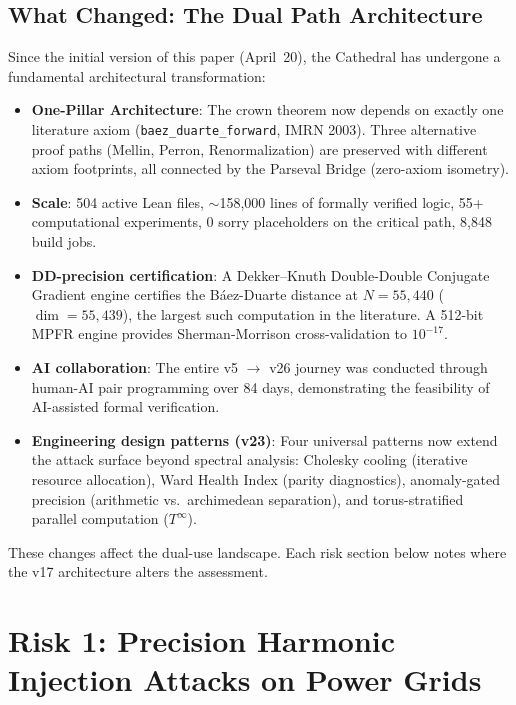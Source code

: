 \documentclass[11pt,a4paper]{article}
\begin{document}
\subsection{What Changed: The Dual Path Architecture}

Since the initial version of this paper (April~20), the Cathedral
has undergone a fundamental architectural transformation:

\begin{itemize}
  \item \textbf{One-Pillar Architecture}: The crown theorem now depends
    on exactly one literature axiom (\texttt{baez\_duarte\_forward},
    IMRN 2003). Three alternative proof paths (Mellin, Perron,
    Renormalization) are preserved with different axiom footprints,
    all connected by the Parseval Bridge (zero-axiom isometry).
  \item \textbf{Scale}: 504 active Lean files, $\sim$158{,}000 lines of
    formally verified logic, 55+ computational experiments,
    0 sorry placeholders on the critical path, 8{,}848 build jobs.
  \item \textbf{DD-precision certification}: A Dekker--Knuth
    Double-Double Conjugate Gradient engine certifies the
    B\'aez-Duarte distance at $N = 55{,}440$ ($\dim = 55{,}439$),
    the largest such computation in the literature. A 512-bit MPFR
    engine provides Sherman-Morrison cross-validation to $10^{-17}$.
  \item \textbf{AI collaboration}: The entire v5 $\to$ v26 journey
    was conducted through human-AI pair programming over 84 days,
    demonstrating the feasibility of AI-assisted formal verification.
  \item \textbf{Engineering design patterns (v23)}: Four universal
    patterns now extend the attack surface beyond spectral analysis:
    Cholesky cooling (iterative resource allocation), Ward Health
    Index (parity diagnostics), anomaly-gated precision (arithmetic
    vs.\ archimedean separation), and torus-stratified parallel
    computation ($T^\infty$).
\end{itemize}

These changes affect the dual-use landscape. Each risk section
below notes where the v17 architecture alters the assessment.

\section{Risk 1: Precision Harmonic Injection Attacks on Power Grids}
\label{sec:harmonics}
\end{document}
